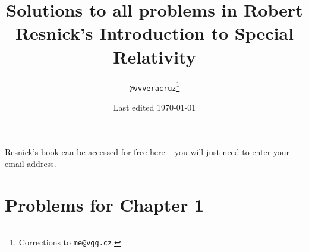 \documentclass[a4paper]{article}
\title{Solutions to all problems in Robert Resnick's Introduction to Special Relativity}
\date{Last edited \today}
\author{\texttt{@vvveracruz}\thanks{Corrections to \texttt{me@vgg.cz}.}}
\begin{document}
\maketitle

Resnick's book can be accessed for free \href{https://www.academia.edu/37630461/Robert_Resnick_-_Introduction_to_Special_Relativity_1968_Wiley_.pdf?auto=download}{here} -- you will just need to enter your email address.

\section{Problems for Chapter 1}
  

\printbibliography
{}
\end{document}
